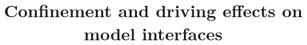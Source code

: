 \documentclass[11pt]{book}
\begin{document}


\title{Confinement and driving effects on model interfaces}                                        
\maketitle

\frontmatter

\setcounter{tocdepth}{4}
\setcounter{secnumdepth}{4}

\tableofcontents
 




\mainmatter





%
%


%



\end{document}
